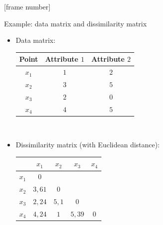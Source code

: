 \documentclass[aspectratio=169,t]{beamer}
\begin{document}
  {
    [frame number]
    \begin{frame}{Example: data matrix and dissimilarity matrix}

        \begin{itemize}
          \item Data matrix: \\[0.1cm]
        \begin{tabular}{| c | c | c |}
        \hline
        Point & Attribute $1$ & Attribute $2$\\\hline
        $x_1$ & $1$ & $2$\\\hline
        $x_2$ & $3$ & $5$\\\hline
        $x_3$ & $2$ & $0$\\\hline
        $x_4$ & $4$ & $5$\\\hline
        \end{tabular}\\[0.5cm]
        \item Dissimilarity matrix (with Euclidean distance): \\[0.1cm]
        \begin{tabular}{| c | c | c | c | c |}
        \hline
         & $x_1$ & $x_2$ & $x_3$ & $x_4$\\\hline
        $x_1$ & $0$ & & & \\\hline
        $x_2$ & $3,61$ & $0$ & & \\\hline
        $x_3$ & $2,24$ & $5,1$ & $0$ & \\\hline
        $x_4$ & $4,24$ & $1$ & $5,39$ & $0$ \\\hline
        \end{tabular}\\[0.2cm]
        \end{itemize}
    \end{frame}
  }
\end{document}
